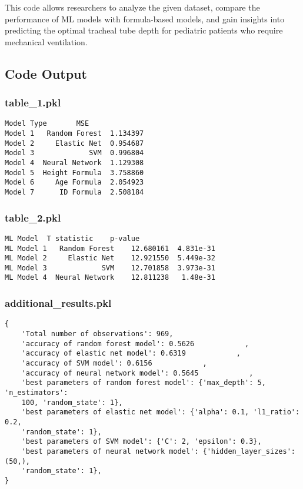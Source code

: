 \documentclass[11pt]{article}
\begin{document}
This code allows researchers to analyze the given dataset, compare the performance of ML models with formula-based models, and gain insights into predicting the optimal tracheal tube depth for pediatric patients who require mechanical ventilation.

\subsection{Code Output}

\subsubsection*{table\_1.pkl}

\begin{Verbatim}[tabsize=4]
             Model Type       MSE
Model 1   Random Forest  1.134397
Model 2     Elastic Net  0.954687
Model 3             SVM  0.996804
Model 4  Neural Network  1.129308
Model 5  Height Formula  3.758860
Model 6     Age Formula  2.054923
Model 7      ID Formula  2.508184
\end{Verbatim}

\subsubsection*{table\_2.pkl}

\begin{Verbatim}[tabsize=4]
                  ML Model  T statistic    p-value
ML Model 1   Random Forest    12.680161  4.831e-31
ML Model 2     Elastic Net    12.921550  5.449e-32
ML Model 3             SVM    12.701858  3.973e-31
ML Model 4  Neural Network    12.811238   1.48e-31
\end{Verbatim}

\subsubsection*{additional\_results.pkl}

\begin{Verbatim}[tabsize=4]
{
    'Total number of observations': 969,
    'accuracy of random forest model': 0.5626            ,
    'accuracy of elastic net model': 0.6319            ,
    'accuracy of SVM model': 0.6156            ,
    'accuracy of neural network model': 0.5645            ,
    'best parameters of random forest model': {'max_depth': 5, 'n_estimators':
	100, 'random_state': 1},
    'best parameters of elastic net model': {'alpha': 0.1, 'l1_ratio': 0.2,
	'random_state': 1},
    'best parameters of SVM model': {'C': 2, 'epsilon': 0.3},
    'best parameters of neural network model': {'hidden_layer_sizes': (50,),
	'random_state': 1},
}
\end{Verbatim}
\end{document}
